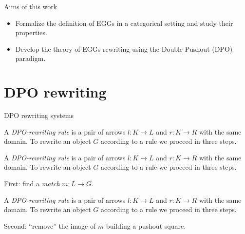 \documentclass[aspectratio=169]{beamer}
\begin{document}
\begin{frame}{Aims of this work} 
    \begin{itemize}
        \item Formalize the definition of EGGs in a categorical setting and study their properties. \pause \medskip 
        \item Develop the theory of EGGs rewriting using the Double Pushout (DPO) paradigm.
    \end{itemize}
\end{frame}

\section{DPO rewriting}

\begin{frame}{DPO rewriting systems} 
	\begin{overprint}

		
		A \emph{DPO-rewriting rule} is a pair of arrows $l:K\to L$ and $r:K\to R$ with the same domain. To rewrite an object $G$ according to a rule we proceed in three steps.
		
		
	A \emph{DPO-rewriting rule} is a pair  of arrows $l:K\to L$ and $r:K\to R$ with the same domain. To rewrite an object $G$ according to a rule we proceed in three steps.
		
		\medskip
		First: find a \emph{match} $m:L\to G$.
		\begin{center}
		\end{center}
		
		
		
		A \emph{DPO-rewriting rule} is a pair  of arrows $l:K\to L$ and $r:K\to R$ with the same domain. To rewrite an object $G$ according to a rule we proceed in three steps.		
		
		\medskip
		Second: ``remove'' the image of $m$  building a pushout square. \vspace{-0.075cm}
		\begin{center}
		\end{center}		
		

\end{overprint}
\end{frame}
\end{document}
